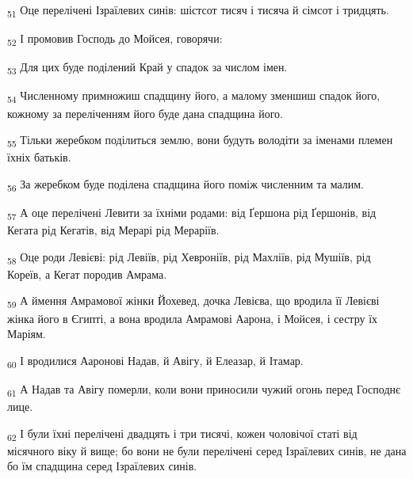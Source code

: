 \begin{tcolorbox}
\textsubscript{51} Оце перелічені Ізраїлевих синів: шістсот тисяч і тисяча й сімсот і тридцять.
\end{tcolorbox}
\begin{tcolorbox}
\textsubscript{52} І промовив Господь до Мойсея, говорячи:
\end{tcolorbox}
\begin{tcolorbox}
\textsubscript{53} Для цих буде поділений Край у спадок за числом імен.
\end{tcolorbox}
\begin{tcolorbox}
\textsubscript{54} Численному примножиш спадщину його, а малому зменшиш спадок його, кожному за переліченням його буде дана спадщина його.
\end{tcolorbox}
\begin{tcolorbox}
\textsubscript{55} Тільки жеребком поділиться землю, вони будуть володіти за іменами племен їхніх батьків.
\end{tcolorbox}
\begin{tcolorbox}
\textsubscript{56} За жеребком буде поділена спадщина його поміж численним та малим.
\end{tcolorbox}
\begin{tcolorbox}
\textsubscript{57} А оце перелічені Левити за їхніми родами: від Ґершона рід Ґершонів, від Кегата рід Кегатів, від Мерарі рід Мераріїв.
\end{tcolorbox}
\begin{tcolorbox}
\textsubscript{58} Оце роди Левієві: рід Левіїв, рід Хевроніїв, рід Махліїв, рід Мушіїв, рід Кореїв, а Кегат породив Амрама.
\end{tcolorbox}
\begin{tcolorbox}
\textsubscript{59} А ймення Амрамової жінки Йохевед, дочка Левієва, що вродила її Левієві жінка його в Єгипті, а вона вродила Амрамові Аарона, і Мойсея, і сестру їх Маріям.
\end{tcolorbox}
\begin{tcolorbox}
\textsubscript{60} І вродилися Ааронові Надав, й Авігу, й Елеазар, й Ітамар.
\end{tcolorbox}
\begin{tcolorbox}
\textsubscript{61} А Надав та Авігу померли, коли вони приносили чужий огонь перед Господнє лице.
\end{tcolorbox}
\begin{tcolorbox}
\textsubscript{62} І були їхні перелічені двадцять і три тисячі, кожен чоловічої статі від місячного віку й вище; бо вони не були перелічені серед Ізраїлевих синів, не дана бо їм спадщина серед Ізраїлевих синів.
\end{tcolorbox}
